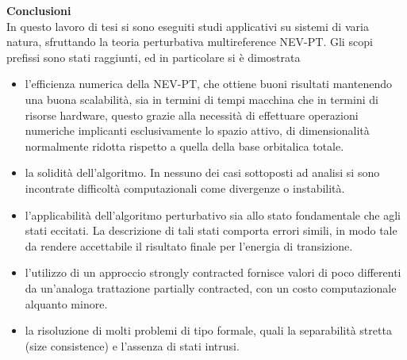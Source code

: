 \pagebreak
\thispagestyle{empty}
{ \Large \textbf{Conclusioni} } 
\vspace{6mm} \\
In questo lavoro di tesi si sono eseguiti studi applicativi su sistemi di
varia natura, sfruttando la teoria perturbativa multireference NEV-PT. Gli
scopi prefissi sono stati raggiunti, ed in particolare si \`e dimostrata

\begin{itemize}
\item l'efficienza numerica della NEV-PT, che ottiene buoni risultati
mantenendo una buona scalabilit\`a, sia in termini di tempi macchina che in
termini di risorse hardware, questo grazie alla necessit\`a di effettuare
operazioni numeriche implicanti esclusivamente lo spazio attivo, di
dimensionalit\`a normalmente ridotta rispetto a quella della base orbitalica
totale.
\item la solidit\`a dell'algoritmo. In nessuno dei casi sottoposti ad
analisi si sono incontrate difficolt\`a computazionali come divergenze o
instabilit\`a.
\item l'applicabilit\`a dell'algoritmo perturbativo sia allo stato
fondamentale che agli stati eccitati. La descrizione di tali stati comporta
errori simili, in modo tale da rendere accettabile il risultato finale per
l'energia di transizione.
\item l'utilizzo di un approccio strongly contracted fornisce valori di poco
differenti da un'analoga trattazione partially contracted, con un costo
computazionale alquanto minore.
\item la risoluzione di molti problemi di tipo formale, 
quali la separabilit\`a stretta (size consistence) e l'assenza di stati
intrusi.
\end{itemize}

